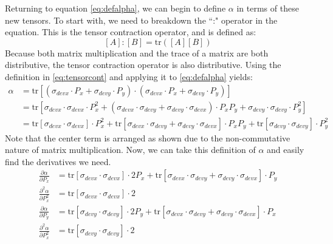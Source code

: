 Returning to equation \ref{eq:defalpha}, we can begin to define $\alpha$ in terms of these new tensors. To start with, we need to breakdown the ``:" operator in the equation. This is the tensor contraction operator, and is defined as: 
   \begin{equation}
	   \left[A\right] : \left[B\right] = \mathrm{tr}(\left[A\right]\left[B\right])
	   \label{eq:tensorcont}
   \end{equation}
Because both matrix multiplication and the trace of a matrix are both distributive, the tensor contraction operator is also distributive. Using the definition in \ref{eq:tensorcont} and applying it to \ref{eq:defalpha} yields: 
   \begin{align}
	   \alpha &= \mathrm{tr}\left[(\sigma_{devx} \cdot P_x + \sigma_{devy} \cdot P_y) \cdot
		    (\sigma_{devx} \cdot P_x + \sigma_{devy} \cdot P_y)\right]\nonumber\\
		  &= \mathrm{tr}\left[\sigma_{devx} \cdot \sigma_{devx} \cdot P_x^2 + \left( 
		     \sigma_{devx} \cdot \sigma_{devy} + \sigma_{devy} \cdot \sigma_{devx} \right) \cdot P_x P_y + 
		     \sigma_{devy} \cdot \sigma_{devy} \cdot P_y^2 \right]\\
		  &= \mathrm{tr}\left[ \sigma_{devx} \cdot \sigma_{devx} \right] \cdot P_x^2 +  
		     \mathrm{tr}\left[ \sigma_{devx} \cdot \sigma_{devy} + \sigma_{devy} \cdot \sigma_{devx} \right]
                     \cdot P_x P_y + \mathrm{tr}\left[ \sigma_{devy} \cdot \sigma_{devy}\right] \cdot P_y^2
   \end{align}
Note that the center term is arranged as shown due to the non-commutative nature of matrix multiplication.
Now, we can take this definition of $\alpha$ and easily find the derivatives we need.
   \begin{align}
	   \frac{\partial \alpha}{\partial P_x} &= 
	   	\mathrm{tr}\left[\sigma_{devx} \cdot \sigma_{devx}\right] \cdot 2P_x + \mathrm{tr} \left[ 
		     \sigma_{devx} \cdot \sigma_{devy} + \sigma_{devy} \cdot \sigma_{devx} \right] \cdot P_y\label{eq:fd_ax}\\
	   \frac{\partial^2 \alpha}{\partial P_x^2} &=
	   	\mathrm{tr}\left[ \sigma_{devx} \cdot \sigma_{devx} \right] \cdot 2\\
	   \frac{\partial \alpha}{\partial P_y} &= 
	   	\mathrm{tr}\left[\sigma_{devy} \cdot \sigma_{devy}\right] \cdot 2P_y + \mathrm{tr} \left[ 
		     \sigma_{devx} \cdot \sigma_{devy} + \sigma_{devy} \cdot \sigma_{devx} \right] \cdot P_x\\
	   \frac{\partial^2 \alpha}{\partial P_x^2} &=
		\mathrm{tr}\left[\sigma_{devy} \cdot \sigma_{devy} \right]\cdot 2\label{eq:sd_ay}
   \end{align}

